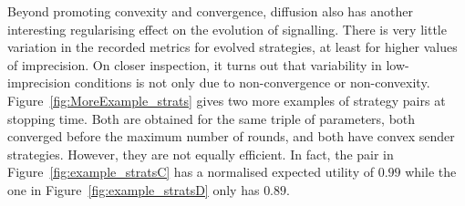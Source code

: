 \documentclass[12pt,english]{article}
\numberwithin{equation}{section}
\begin{document}
Beyond promoting convexity and convergence, diffusion also has another interesting regularising
effect on the evolution of signalling. There is very little variation in the recorded metrics
for evolved strategies, at least for higher values of imprecision. On closer inspection, it
turns out that variability in low-imprecision conditions is not only due to non-convergence or
non-convexity. Figure~\ref{fig:MoreExample_strats} gives two more examples of strategy pairs at
stopping time. Both are obtained for the same triple of parameters, both converged before the
maximum number of rounds, and both have convex sender strategies. However, they are not equally
efficient. In fact, the pair in Figure~\ref{fig:example_stratsC} has a normalised expected
utility of $0.99$ while the one in Figure~\ref{fig:example_stratsD} only has $0.89$.
\end{document}

